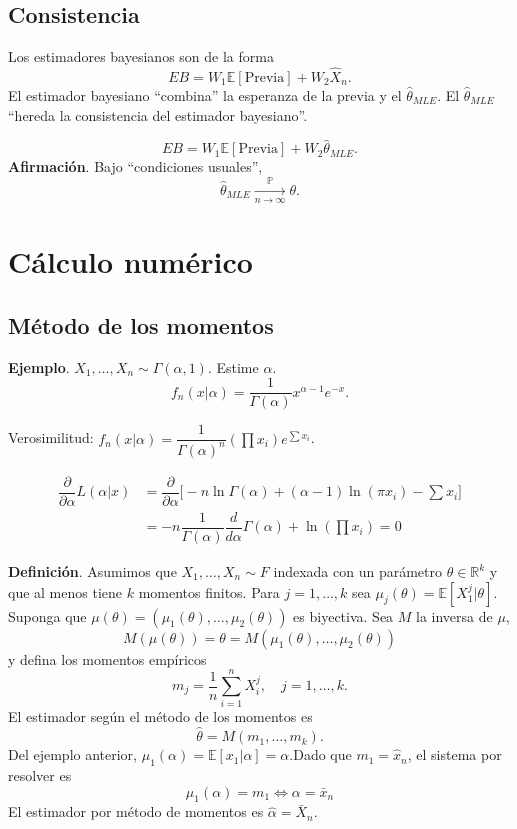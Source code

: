 \documentclass[
  12pt,
]{book}
\begin{document}
\hypertarget{consistencia}{%
\subsection{Consistencia}\label{consistencia}}

Los estimadores bayesianos son de la forma
\[EB = W_1\mathbb{E}[\text{Previa}] + W_2\hat X_n.\]
El estimador bayesiano ``combina'' la esperanza de la previa y el \(\hat\theta_{MLE}\). El \(\hat\theta_{MLE}\) ``hereda la consistencia del estimador bayesiano''.

\[EB = W_1\mathbb{E}[\text{Previa}] + W_2 \hat\theta_{MLE}.\]
\textbf{Afirmación}. Bajo ``condiciones usuales'',
\[\hat\theta_{MLE} \xrightarrow[n\to \infty]{\mathbb P}\theta.\]

\hypertarget{cuxe1lculo-numuxe9rico}{%
\section{Cálculo numérico}\label{cuxe1lculo-numuxe9rico}}

\hypertarget{muxe9todo-de-los-momentos}{%
\subsection{Método de los momentos}\label{muxe9todo-de-los-momentos}}

\textbf{Ejemplo}. \(X_1,\dots, X_n \sim \Gamma(\alpha,1)\). Estime \(\alpha\).
\[f_n(x|\alpha) = \dfrac{1}{\Gamma(\alpha)}x^{\alpha-1}e^{-x}.\]

Verosimilitud: \(f_n(x|\alpha) = \dfrac 1 {\Gamma(\alpha)^n}(\prod x_i)e^{\sum x_i}\).

\begin{align*}
\dfrac{\partial}{\partial \alpha} L(\alpha|x) & = \dfrac{\partial}{\partial \alpha} \bigg[ -n\ln \Gamma(\alpha) + (\alpha-1)\ln(\pi x_i) - \sum x_i\bigg]\\
& = -n\dfrac{1}{\Gamma(\alpha)} \dfrac d{d\alpha}\Gamma(\alpha) + \ln (\prod x_i) = 0
\end{align*}

\textbf{Definición}. Asumimos que \(X_1,\dots, X_n \sim F\) indexada con un parámetro \(\theta \in \mathbb{R}^k\) y que al menos tiene \(k\) momentos finitos. Para \(j = 1,\dots, k\) sea \(\mu_j(\theta) = \mathbb{E}[X_1^j|\theta]\). Suponga que \(\mu(\theta) = (\mu_1(\theta),\dots,\mu_2(\theta))\) es biyectiva. Sea \(M\) la inversa de \(\mu\),
\[ M(\mu(\theta)) = \theta =M(\mu_1(\theta),\dots,\mu_2(\theta)) \]
y defina los momentos empíricos
\[ m_j = \dfrac 1n \sum_{i=1}^n X_i^j, \quad j=1,\dots, k.\]
El estimador según el método de los momentos es
\[\hat\theta = M(m_1,\dots,m_k).\]
Del ejemplo anterior, \(\mu_1(\alpha) = \mathbb{E}[x_1|\alpha] = \alpha\).Dado que \(m_1 = \hat x_n\), el sistema por resolver es
\[ \mu_1(\alpha) = m_1 \Longleftrightarrow \alpha = \bar x_n\]
El estimador por método de momentos es \(\hat \alpha = \bar X_n\).
\end{document}
